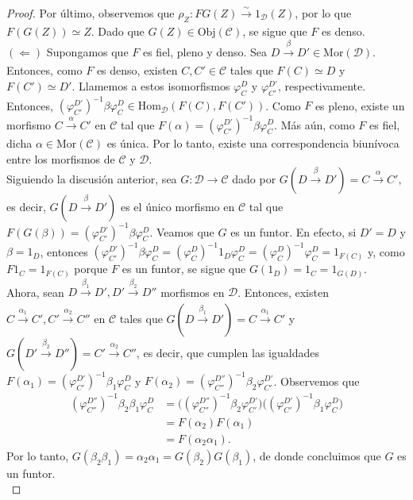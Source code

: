 \documentclass[tesis]{subfiles}
\begin{document}
\begin{proof}
    Por último, observemos que $\rho_Z:FG(Z)\xrightarrow[]{\sim}1_\mathscr{D}(Z)$, por lo que $F(G(Z))\simeq Z$. Dado que $G(Z)\in\text{Obj}(\mathscr{C})$, se sigue que $F$ es denso. \\

    $(\Leftarrow)$ Supongamos que $F$ es fiel, pleno y denso. Sea $D\xrightarrow[]{\beta} D'\in\text{Mor}(\mathscr{D})$. Entonces, como $F$ es denso, existen $C,C'\in\mathscr{C}$ tales que $F(C)\simeq D$ y $F(C')\simeq D'$. Llamemos a estos isomorfismos $\varphi_C^D$ y $\varphi_{C'}^{D'}$, respectivamente. Entonces, $(\varphi_{C'}^{D'})^{-1}\beta\varphi_C^D\in\text{Hom}_\mathscr{D}(F(C),F(C'))$. Como $F$ es pleno, existe un morfismo $C\xrightarrow[]{\alpha} C'$ en $\mathscr{C}$ tal que $F(\alpha) = (\varphi_{C'}^{D'})^{-1}\beta\varphi_C^D$. Más aún, como $F$ es fiel, dicha $\alpha\in\text{Mor}(\mathscr{C})$ es única. Por lo tanto, existe una correspondencia biunívoca entre los morfismos de $\mathscr{C}$ y $\mathscr{D}$. \\

    Siguiendo la discusión anterior, sea $G:\mathscr{D}\to \mathscr{C}$ dado por $G(D\xrightarrow[]{\beta}D') = C\xrightarrow[]{\alpha}C'$, es decir, $G(D\xrightarrow[]{\beta}D')$ es el único morfismo en $\mathscr{C}$ tal que $F(G(\beta)) = (\varphi_{C'}^{D'})^{-1}\beta\varphi_C^D$. Veamos que $G$ es un funtor. En efecto, si $D'=D$ y $\beta=1_D$, entonces $(\varphi_{C'}^{D'})^{-1}\beta\varphi_C^D = (\varphi_C^D)^{-1} 1_D \varphi_C^D = (\varphi_C^D)^{-1}\varphi_C^D = 1_{F(C)}$ y, como $F1_C = 1_{F(C)}$ porque $F$ es un funtor, se sigue que $G(1_D) = 1_C = 1_{G(D)}$. \\

    Ahora, sean $D\xrightarrow[]{\beta_1} D', D'\xrightarrow[]{\beta_2} D''$ morfismos en $\mathscr{D}$. Entonces, existen $C\xrightarrow[]{\alpha_1} C', C'\xrightarrow[]{\alpha_2} C''$ en $\mathscr{C}$ tales que $G(D\xrightarrow[]{\beta_1}D') = C\xrightarrow[]{\alpha_1}C'$ y $G(D'\xrightarrow[]{\beta_2}D'') = C'\xrightarrow[]{\alpha_2}C''$, es decir, que cumplen las igualdades $F(\alpha_1) = (\varphi_{C'}^{D'})^{-1}\beta_1\varphi_C^D$ y $F(\alpha_2) = (\varphi_{C''}^{D''})^{-1}\beta_2\varphi_{C'}^{D'}$. Observemos que
    \begin{align*}
        (\varphi_{C''}^{D''})^{-1} \beta_2\beta_1 \varphi_C^D &= \big( (\varphi_{C''}^{D''})^{-1} \beta_2 \varphi_{C'}^{D'} \big) \big( (\varphi_{C'}^{D'})^{-1} \beta_1 \varphi_C^D\big) \\
                                                              &= F(\alpha_2)F(\alpha_1) \\
                                                              &= F(\alpha_2\alpha_1). \tag{pues $F$ es un funtor}
    \end{align*}
    Por lo tanto, $G(\beta_2\beta_1) = \alpha_2\alpha_1 = G(\beta_2)G(\beta_1)$, de donde concluimos que $G$ es un funtor. \\


\end{proof}
\end{document}

